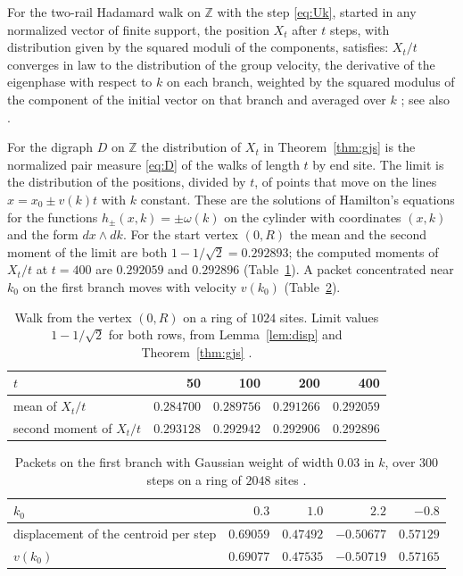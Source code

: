 \begin{theorem}\label{thm:gjs}
For the two-rail Hadamard walk on $\mathbb{Z}$ with the step \eqref{eq:Uk}, started in any normalized vector of finite support, the position $X_t$ after $t$ steps, with distribution given by the squared moduli of the components, satisfies: $X_t/t$ converges in law to the distribution of the group velocity, the derivative of the eigenphase with respect to $k$ on each branch, weighted by the squared modulus of the component of the initial vector on that branch and averaged over $k$ \cite{gjs}; see also \cite{suzuki}.
\end{theorem}

For the digraph $D$ on $\mathbb{Z}$ the distribution of $X_t$ in Theorem~\ref{thm:gjs} is the normalized pair measure \eqref{eq:D} of the walks of length $t$ by end site. The limit is the distribution of the positions, divided by $t$, of points that move on the lines $x=x_0\pm v(k)t$ with $k$ constant. These are the solutions of Hamilton's equations for the functions $h_\pm(x,k)=\pm\omega(k)$ on the cylinder with coordinates $(x,k)$ and the form $dx\wedge dk$. For the start vertex $(0,R)$ the mean and the second moment of the limit are both $1-1/\sqrt2=0.292893$; the computed moments of $X_t/t$ at $t=400$ are $0.292059$ and $0.292896$ (Table~\ref{tab:weak}). A packet concentrated near $k_0$ on the first branch moves with velocity $v(k_0)$ (Table~\ref{tab:packet}).

\begin{table}[ht]\centering\small
\begin{tabular}{@{}lrrrr@{}}\toprule
$t$ & 50 & 100 & 200 & 400\\\midrule
mean of $X_t/t$ & $0.284700$ & $0.289756$ & $0.291266$ & $0.292059$\\
second moment of $X_t/t$ & $0.293128$ & $0.292942$ & $0.292906$ & $0.292896$\\\bottomrule
\end{tabular}
\caption{Walk from the vertex $(0,R)$ on a ring of $1024$ sites. Limit values $1-1/\sqrt2$ for both rows, from Lemma~\ref{lem:disp} and Theorem~\ref{thm:gjs} \cite{comp3}.}\label{tab:weak}
\end{table}

\begin{table}[ht]\centering\small
\begin{tabular}{@{}lrrrr@{}}\toprule
$k_0$ & $0.3$ & $1.0$ & $2.2$ & $-0.8$\\\midrule
displacement of the centroid per step & $0.69059$ & $0.47492$ & $-0.50677$ & $0.57129$\\
$v(k_0)$ & $0.69077$ & $0.47535$ & $-0.50719$ & $0.57165$\\\bottomrule
\end{tabular}
\caption{Packets on the first branch with Gaussian weight of width $0.03$ in $k$, over $300$ steps on a ring of $2048$ sites \cite{comp3}.}\label{tab:packet}
\end{table}


